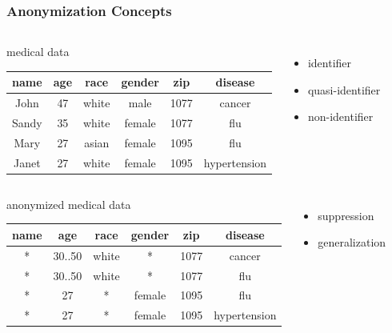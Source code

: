 \begin{frame}
  \frametitle{Anonymization Concepts}
  \begin{columns}
    \begin{block}{medical data}
      \vspace{10pt}
      \tiny
      \begin{tabular}{ c|c|c|c|c|c }
        \textbf{name} & \textbf{age} & \textbf{race} & \textbf{gender} & \textbf{zip} & \textbf{disease} \\
        \hline
  \color{orange} John & 47 & white & male & 1077 & \color{violet} cancer \\
        \hline
  \color{orange} Sandy & 35 & white & female & 1077 & \color{violet} flu \\
        \hline
  \color{orange} Mary & 27 & asian & female & 1095 & \color{violet} flu \\
        \hline
  \color{orange} Janet & 27 & white & female & 1095 & \color{violet} hypertension
      \end{tabular}
    \end{block}
    \begin{itemize}
      \item{\color{orange} identifier}
      \item quasi-identifier
      \item{\color{violet} non-identifier}
    \end{itemize}
  \end{columns}
  \vspace{20pt}
  \begin{columns}
    \begin{block}{anonymized medical data}
      \vspace{10pt}
      \tiny
        \begin{tabular}{ c|c|c|c|c|c }
        \textbf{name} & \textbf{age} & \textbf{race} & \textbf{gender} & \textbf{zip} & \textbf{disease} \\
        \hline
  \color{red} * & \color{blue} 30..50 & white & \color{red} * & 1077 & cancer \\
        \hline
        \color{red} * & \color{blue} 30..50 & white & \color{red} * & 1077 & flu \\
        \hline
        \color{red} * & 27 & \color{red} * & female & 1095 & flu \\
        \hline
        \color{red} * & 27 & \color{red} * & female & 1095 & hypertension
      \end{tabular}
    \end{block}
    \begin{itemize}
      \item{\color{red} suppression}
      \item{\color{blue} generalization}
    \end{itemize}
  \end{columns}
\end{frame}

